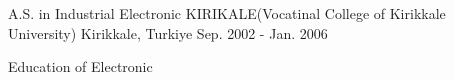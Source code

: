 
\begin{cventries}

  \cventry
    {A.S. in Industrial Electronic} %
    {KIRIKALE(Vocatinal College of Kirikkale University)} %
    {Kirikkale, Turkiye} %
    {Sep. 2002 - Jan. 2006} %
    {
      \begin{cvitems} %
        \item {Education of Electronic}
      \end{cvitems}
    }

\end{cventries}
